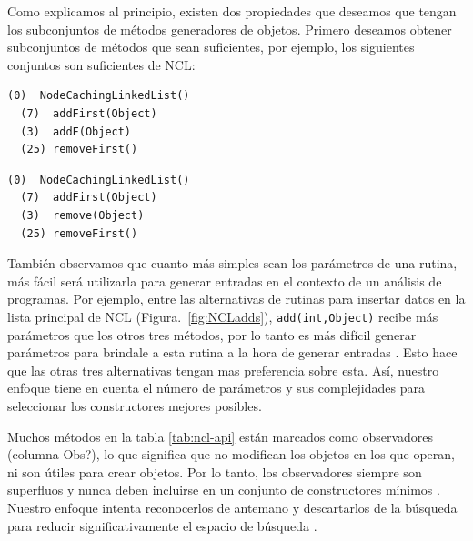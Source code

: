 Como explicamos al principio, existen dos propiedades que deseamos que tengan los subconjuntos de métodos generadores de objetos. Primero deseamos obtener subconjuntos de métodos que sean suficientes, por ejemplo, los siguientes conjuntos son suficientes de NCL:
\\

\begin{lstlisting}[numbers=none,label=fig:NCLnoMin, frame=tb , basicstyle=\scriptsize]
  (0)  NodeCachingLinkedList()
  (7)  addFirst(Object)
  (3)  addF(Object)
  (25) removeFirst()
\end{lstlisting}

\begin{lstlisting}[numbers=none,label=fig:NCLnoMin1, caption= Conjuntos de metodos builders suficientes pero no mínimos, captionpos=b, frame=tb , basicstyle=\scriptsize]
  (0)  NodeCachingLinkedList()
  (7)  addFirst(Object)
  (3)  remove(Object)
  (25) removeFirst()
\end{lstlisting}

También observamos que cuanto más simples sean los parámetros de una rutina, más
fácil será utilizarla para generar entradas en el contexto de un análisis de
programas. Por ejemplo, entre las alternativas de rutinas para insertar datos en
la lista principal de NCL (Figura.~\ref{fig:NCLadds}), \texttt{add(int,Object)}
recibe más parámetros que los otros tres métodos, por lo tanto es más difícil
generar parámetros para brindale a esta rutina a la hora de generar entradas
. Esto hace que las otras tres alternativas tengan mas preferencia sobre esta. Así, nuestro enfoque tiene en cuenta el número de parámetros y sus complejidades para seleccionar los constructores mejores posibles.

Muchos métodos en la tabla \ref{tab:ncl-api} están marcados como observadores
(columna Obs?), lo que significa que no modifican los objetos en los que operan,
ni son útiles para crear objetos. Por lo tanto, los observadores siempre son superfluos y nunca deben incluirse en un conjunto de constructores mínimos
. Nuestro enfoque intenta reconocerlos de antemano y
descartarlos de la búsqueda para reducir significativamente el espacio de
búsqueda .



